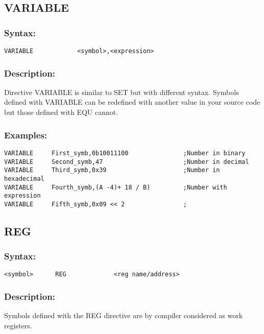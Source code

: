     \subsection{VARIABLE}
        \subsubsection{Syntax:}
        {
            \usecodefont
            \verb'VARIABLE            <symbol>,<expression>'
        }

        \subsubsection{Description:}
            Directive VARIABLE is similar to SET but with different syntax. Symbols defined with VARIABLE can be redefined with another value in your source code but those defined with EQU cannot.

        \subsubsection{Examples:}
        {
            \usecodefont
            \verb'VARIABLE     First_symb,0b10011100               ;Number in binary'\\
            \verb'VARIABLE     Second_symb,47                      ;Number in decimal'\\
            \verb'VARIABLE     Third_symb,0x39                     ;Number in hexadecimal'\\
            \verb'VARIABLE     Fourth_symb,(A -4)+ 18 / B)         ;Number with expression'\\
            \verb'VARIABLE     Fifth_symb,0x09 << 2                ;'\\
        }

    \subsection{REG}
        \subsubsection{Syntax:}
        {
            \usecodefont
            \verb'<symbol>      REG             <reg name/address>'
        }

        \subsubsection{Description:}
            Symbols defined with the REG directive are by compiler considered as work registers.

